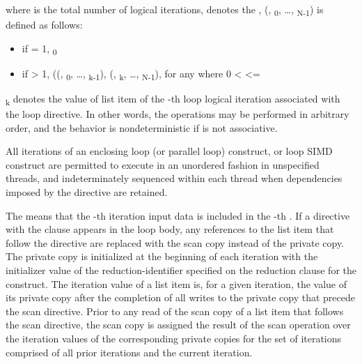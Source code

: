 where  is the total number of logical iterations,  denotes the ,  
(, \textsubscript{0}, \ldots, \textsubscript{N-1}) 
is defined as follows: 

\begin{itemize}
\item if  = 1, \textsubscript{0}
\item if  > 1, ((, \textsubscript{0}, \ldots, \textsubscript{k-1}),
      (, \textsubscript{k}, \ldots, \textsubscript{N-1}), for any  where 0 <  <= 
\end{itemize}

\textsubscript{k} denotes the value of list item of the -th loop logical iteration associated
with the loop directive. In other words, the  operations may be performed in arbitrary order,
and the behavior is nondeterministic if  is not associative.

All iterations of an enclosing loop (or parallel loop) construct,  or loop SIMD 
construct are permitted to execute in an unordered fashion in unspecified threads, and 
indeterminately sequenced within each thread when dependencies imposed by 
the  directive are retained. 


The  means that the -th iteration 
input data is included in the -th .
If a  directive with the  clause appears in the loop
body, any references to the list item that follow the directive
are replaced with the scan copy instead of the private copy.  The
private copy is initialized at the beginning of each iteration
with the initializer value of the reduction-identifier specified
on the reduction clause for the construct. The iteration value of
a list item is, for a given iteration, the value of its private
copy after the completion of all writes to the private copy that
precede the scan directive. Prior to any read of the scan copy of
a list item that follows the scan directive, the scan copy is
assigned the result of the scan operation over the iteration
values of the corresponding private copies for the set of
iterations comprised of all prior iterations and the current
iteration.
 
